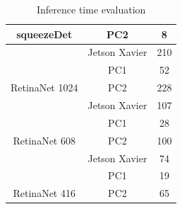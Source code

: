 \documentclass[twoside]{ctuthesis}
\theoremstyle{plain}
\theoremstyle{definition}
\theoremstyle{note}
\begin{document}
\begin{table}[H]
\begin{tabular}{|c|c|c|}
\multirow{-3}{*}{squeezeDet}                             & PC2                                                        & 8                                                                          \\ \hline
                                                         & Jetson Xavier                                              & 210                                                                        \\ \cline{2-3} 
                                                         & PC1                                                        & 52                                                                         \\ \cline{2-3} 
\multirow{-3}{*}{RetinaNet 1024}                      & PC2                                                        & 228                                                                        \\ \hline
                                                         & Jetson Xavier                                              & 107                                                                        \\ \cline{2-3} 
                                                         & PC1                                                        & 28                                                                         \\ \cline{2-3} 
\multirow{-3}{*}{RetinaNet 608}                       & PC2                                                        & 100                                                                        \\ \hline
                                                         & Jetson Xavier                                              & 74                                                                         \\ \cline{2-3} 
                                                         & PC1                                                        & 19                                                                         \\ \cline{2-3} 
\multirow{-3}{*}{RetinaNet 416}                       & PC2                                                        & 65                                                                         \\ \hline
\end{tabular}
\caption{Inference time evaluation}
\label{inference_time}
\end{table}
\end{document}
